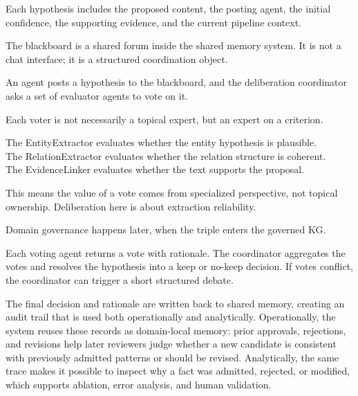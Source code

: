 Each hypothesis includes the proposed content, the posting agent, the
initial confidence, the supporting evidence, and the current pipeline
context.

The blackboard is a shared forum inside the shared memory system. It is
not a chat interface; it is a structured coordination object.

An agent posts a hypothesis to the blackboard, and the deliberation
coordinator asks a set of evaluator agents to vote on it.

Each voter is not necessarily a topical expert, but an expert on a
criterion.

The EntityExtractor evaluates whether the entity hypothesis is
plausible.\\
The RelationExtractor evaluates whether the relation structure is
coherent.\\
The EvidenceLinker evaluates whether the text supports the proposal.

This means the value of a vote comes from specialized perspective, not
topical ownership. Deliberation here is about extraction reliability.

Domain governance happens later, when the triple enters the governed KG.

Each voting agent returns a vote with rationale. The coordinator
aggregates the votes and resolves the hypothesis into a keep or no-keep
decision. If votes conflict, the coordinator can trigger a short
structured debate.

The final decision and rationale are written back to shared memory,
creating an audit trail that is used both operationally and
analytically. Operationally, the system reuses these records as
domain-local memory: prior approvals, rejections, and revisions help
later reviewers judge whether a new candidate is consistent with
previously admitted patterns or should be revised. Analytically, the
same trace makes it possible to inspect why a fact was admitted,
rejected, or modified, which supports ablation, error analysis, and
human validation.

